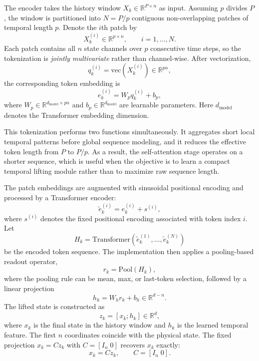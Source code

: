 \documentclass[journal]{IEEEtran}
\begin{document}
The encoder takes the history window $X_k \in \mathbb{R}^{P\times n}$ as input. Assuming $p$ divides $P$, the window is partitioned into $N=P/p$ contiguous non-overlapping patches of temporal length $p$. Denote the $i$th patch by
\begin{equation}
    X_k^{(i)} \in \mathbb{R}^{p\times n}, \qquad i=1,\ldots,N.
\end{equation}
Each patch contains all $n$ state channels over $p$ consecutive time steps, so the tokenization is \emph{jointly multivariate} rather than channel-wise. After vectorization,
\begin{equation}
    q_k^{(i)} = \mathrm{vec}(X_k^{(i)}) \in \mathbb{R}^{pn},
\end{equation}
the corresponding token embedding is
\begin{equation}
    e_k^{(i)} = W_p q_k^{(i)} + b_p,
    \label{eq:patch_embedding}
\end{equation}
where $W_p \in \mathbb{R}^{d_{\mathrm{model}}\times pn}$ and $b_p \in \mathbb{R}^{d_{\mathrm{model}}}$ are learnable parameters. Here $d_{\mathrm{model}}$ denotes the Transformer embedding dimension.

This tokenization performs two functions simultaneously. It aggregates short local temporal patterns before global sequence modeling, and it reduces the effective token length from $P$ to $P/p$. As a result, the self-attention stage operates on a shorter sequence, which is useful when the objective is to learn a compact temporal lifting module rather than to maximize raw sequence length.

The patch embeddings are augmented with sinusoidal positional encoding and processed by a Transformer encoder:
\begin{equation}
    \tilde{e}_k^{(i)} = e_k^{(i)} + s^{(i)},
\end{equation}
where $s^{(i)}$ denotes the fixed positional encoding associated with token index $i$. Let
\begin{equation}
    H_k = \mathrm{Transformer}(\tilde{e}_k^{(1)},\ldots,\tilde{e}_k^{(N)})
\end{equation}
be the encoded token sequence. The implementation then applies a pooling-based readout operator,
\begin{equation}
    r_k = \mathrm{Pool}(H_k),
\end{equation}
where the pooling rule can be mean, max, or last-token selection, followed by a linear projection
\begin{equation}
    h_k = W_h r_k + b_h \in \mathbb{R}^{d-n}.
    \label{eq:history_feature}
\end{equation}
The lifted state is constructed as
\begin{equation}
    z_k = [x_k;h_k] \in \mathbb{R}^{d},
    \label{eq:lifted_state_form}
\end{equation}
where $x_k$ is the final state in the history window and $h_k$ is the learned temporal feature. The first $n$ coordinates coincide with the physical state. The fixed projection $x_k=Cz_k$ with $C=[I_n\;0]$ recovers $x_k$ exactly:
\begin{equation}
    x_k = C z_k, \qquad C = [I_n\;0].
    \label{eq:decoder_projection}
\end{equation}
\end{document}
